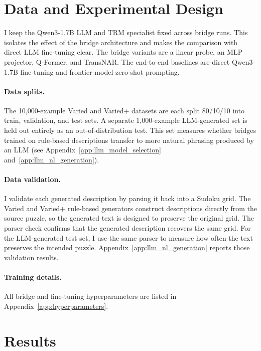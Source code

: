 \documentclass[11pt]{article}
\begin{document}
\section{Data and Experimental Design}
\label{sec:experiments}
\label{sec:training_setup}

I keep the Qwen3-1.7B \cite{yangQwen3TechnicalReport2025} LLM and TRM specialist fixed across bridge runs.
This isolates the effect of the bridge architecture and makes the comparison with direct LLM fine-tuning clear.
The bridge variants are a linear probe, an MLP projector, Q-Former, and TransNAR.
The end-to-end baselines are direct Qwen3-1.7B fine-tuning and frontier-model zero-shot prompting.

\paragraph{Data splits.}
The 10,000-example Varied and Varied+ datasets are each split 80/10/10 into train, validation, and test sets.
A separate 1,000-example LLM-generated set is held out entirely as an out-of-distribution test.
This set measures whether bridges trained on rule-based descriptions transfer to more natural phrasing produced by an LLM (see Appendix~\ref{app:llm_model_selection} and~\ref{app:llm_nl_generation}).

\paragraph{Data validation.}
I validate each generated description by parsing it back into a Sudoku grid.
The Varied and Varied+ rule-based generators construct descriptions directly from the source puzzle, so the generated text is designed to preserve the original grid.
The parser check confirms that the generated description recovers the same grid.
For the LLM-generated test set, I use the same parser to measure how often the text preserves the intended puzzle.
Appendix~\ref{app:llm_nl_generation} reports those validation results.

\paragraph{Training details.}
All bridge and fine-tuning hyperparameters are listed in Appendix~\ref{app:hyperparameters}.

\section{Results}
\label{sec:results}
\end{document}
